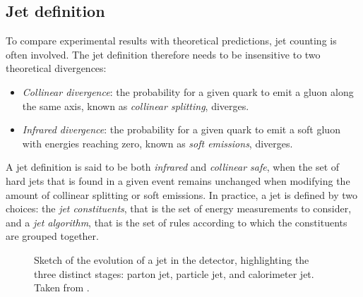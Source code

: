 \subsection{Jet definition}
To compare experimental results with theoretical predictions, jet counting is often involved. The jet definition therefore needs to be insensitive to two theoretical divergences:
\begin{itemize}
    \item \emph{Collinear divergence}: the probability for a given quark to emit a gluon along the same axis, known as \emph{collinear splitting}, diverges.
    \item \emph{Infrared divergence}: the probability for a given quark to emit a soft gluon with energies reaching zero, known as \emph{soft emissions}, diverges.
\end{itemize}
A jet definition is said to be both \emph{infrared} and \emph{collinear safe}, when the set of hard jets that is found in a given event remains unchanged when modifying the amount of collinear splitting or soft emissions.
In practice, a jet is defined by two choices: the \emph{jet constituents}, that is the set of energy measurements to consider, and a \emph{jet algorithm}, that is the set of rules according to which the constituents are grouped together.


\FloatBarrier
\begin{figure}
    \caption{Sketch of the evolution of a jet in the detector, highlighting the three distinct stages: parton jet, particle jet, and calorimeter jet. Taken from .}
    \label{fig:jet-evolution}
\end{figure}

